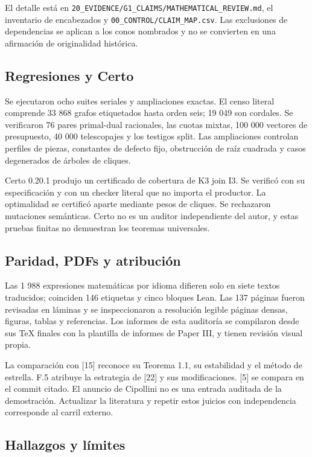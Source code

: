 \documentclass[11pt]{article}
\begin{document}
El detalle está en
\nolinkurl{20_EVIDENCE/G1_CLAIMS/MATHEMATICAL_REVIEW.md}, el inventario
de encabezados y \nolinkurl{00_CONTROL/CLAIM_MAP.csv}. Las exclusiones de
dependencias se aplican a los conos nombrados y no se convierten en una
afirmación de originalidad histórica.

\subsection{Regresiones y Certo}\label{regresiones-y-certo}

Se ejecutaron ocho suites seriales y ampliaciones exactas. El censo
literal comprende 33 868 grafos etiquetados hasta orden seis; 19 049 son
cordales. Se verificaron 76 pares primal-dual racionales, las cuotas
mixtas, 100 000 vectores de presupuesto, 40 000 telescopajes y los
testigos split. Las ampliaciones controlan perfiles de piezas,
constantes de defecto fijo, obstrucción de raíz cuadrada y casos
degenerados de árboles de cliques.

Certo 0.20.1 produjo un certificado de cobertura de K3 join I3. Se
verificó con su especificación y con un checker literal que no importa
el productor. La optimalidad se certificó aparte mediante pesos de
cliques. Se rechazaron mutaciones semánticas. Certo no es un auditor
independiente del autor, y estas pruebas finitas no demuestran los
teoremas universales.

\subsection{Paridad, PDFs y
atribución}\label{paridad-pdfs-y-atribuciuxf3n}

Las 1 988 expresiones matemáticas por idioma difieren solo en siete
textos traducidos; coinciden 146 etiquetas y cinco bloques Lean. Las 137
páginas fueron revisadas en láminas y se inspeccionaron a resolución
legible páginas densas, figuras, tablas y referencias. Los informes de
esta auditoría se compilaron desde sus TeX finales con la plantilla de
informes de Paper III, y tienen revisión visual propia.

La comparación con {[}15{]} reconoce su Teorema 1.1, su estabilidad y el
método de estrella. F.5 atribuye la estrategia de {[}22{]} y sus
modificaciones. {[}5{]} se compara en el commit citado. El anuncio de
Cipollini no es una entrada auditada de la demostración. Actualizar la
literatura y repetir estos juicios con independencia corresponde al
carril externo.

\subsection{Hallazgos y límites}\label{hallazgos-y-luxedmites}
\end{document}

